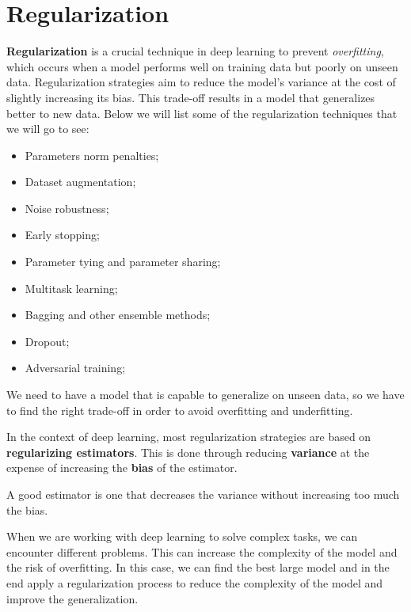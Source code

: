 \section{Regularization}
\textbf{Regularization} is a crucial technique in deep learning to prevent
\textit{overfitting}, which occurs when a model performs well on training data
but poorly on unseen data. Regularization strategies aim to reduce the model's
variance at the cost of slightly increasing its bias. This trade-off results in
a model that generalizes better to new data. Below we will list some of the
regularization techniques that we will go to see:
\begin{itemize}
    \item Parameters norm penalties;
    \item Dataset augmentation;
    \item Noise robustness;
    \item Early stopping;
    \item Parameter tying and parameter sharing;
    \item Multitask learning;
    \item Bagging and other ensemble methods;
    \item Dropout;
    \item Adversarial training;
\end{itemize}

We need to have a model that is capable to generalize on unseen data, so we have
to find the right trade-off in order to avoid overfitting and underfitting.

In the context of deep learning, most regularization strategies are based on
\textbf{regularizing estimators}. This is done through reducing \textbf{variance}
at the expense of increasing the \textbf{bias} of the estimator.
\begin{note}
    A good estimator is one that decreases the variance without increasing too
    much the bias.
\end{note}

When we are working with deep learning to solve complex tasks, we can encounter
different problems. This can increase the complexity of the model and the risk of
overfitting. In this case, we can find the best large model and in the end apply
a regularization process to reduce the complexity of the model and improve the
generalization.

